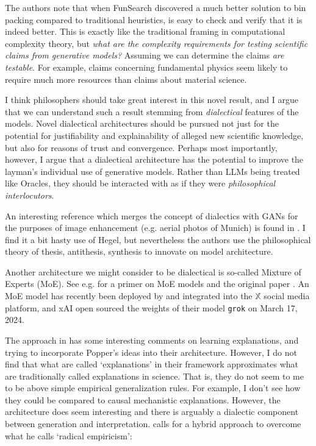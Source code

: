 The authors note that when FunSearch discovered a much better solution to bin packing compared to traditional heuristics, is easy to check and verify that it is indeed better.  This is exactly like the traditional framing in computational complexity theory, but \emph{what are the complexity requirements for testing scientific claims from generative models?}  Assuming we can determine the claims \emph{are testable}.  For example, claims concerning fundamental physics seem likely to require much more resources than claims about material science.

I think philosophers should take great interest in this novel result, and I argue that we can understand such a result stemming from \emph{dialectical} features of the models.  Novel dialectical architectures should be pursued not just for the potential for justifiability and explainability of alleged new scientific knowledge, but also for reasons of trust and convergence.  Perhaps most importantly, however, I argue that a dialectical architecture has the potential to improve the layman's individual use of generative models.  Rather than LLMs being treated like Oracles, they should be interacted with as if they were \emph{philosophical interlocutors}.


An interesting reference which merges the concept of dialectics with GANs for the purposes of image enhancement (e.g. aerial photos of Munich) is found in \citep{DialecticalGANS2018}.  I find it a bit hasty use of Hegel, but nevertheless the authors use the philosophical theory of thesis, antithesis, synthesis to innovate on model architecture.


Another architecture we might consider to be dialectical is so-called Mixture of Experts (MoE).  See e.g. \citep{HFMOE} for a primer on MoE models and the original paper \citep{MixtureExperts1991}.  An MoE model has recently been deployed by and integrated into the $\mathbb{X}$ social media platform, and xAI open sourced the weights of their model \texttt{grok} on March 17, 2024.  



The approach in \citep{Norelli2022} has some interesting comments on learning explanations, and trying to incorporate Popper's ideas into their architecture. However, I do not find that what are called `explanations' in their framework approximates what are traditionally called explanations in science.  That is, they do not seem to me to be above simple empirical generalization rules.  For example, I don't see how they could be compared to causal mechanistic explanations.  However, the architecture does seem interesting and there is arguably a dialectic component between generation and interpretation. \citep{Pearl2021} calls for a hybrid approach to overcome what he calls `radical empiricism':

